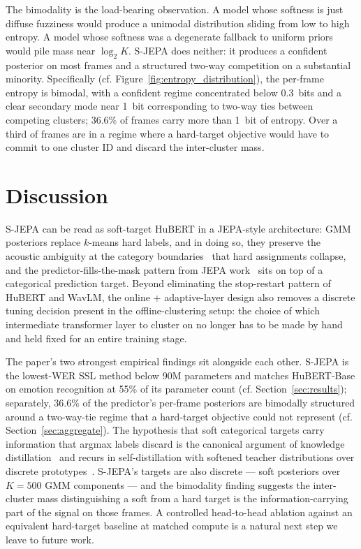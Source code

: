 \documentclass[9pt,twocolumn]{article}
\theoremstyle{plain}
\theoremstyle{definition}
\theoremstyle{remark}
\begin{document}
The bimodality is the load-bearing observation. A model whose softness is just diffuse fuzziness would produce a unimodal distribution sliding from low to high entropy. A model whose softness was a degenerate fallback to uniform priors would pile mass near $\log_2 K$. S-JEPA does neither: it produces a confident posterior on most frames and a structured two-way competition on a substantial minority. Specifically (cf. Figure~\ref{fig:entropy_distribution}), the per-frame entropy is bimodal, with a confident regime concentrated below 0.3~bits and a clear secondary mode near 1~bit corresponding to two-way ties between competing clusters; 36.6\% of frames carry more than 1~bit of entropy. Over a third of frames are in a regime where a hard-target objective would have to commit to one cluster ID and discard the inter-cluster mass.


\section{Discussion}

S-JEPA can be read as soft-target HuBERT in a JEPA-style architecture: GMM posteriors replace $k$-means hard labels, and in doing so, they preserve the acoustic ambiguity at the category boundaries~\citep{ladefoged2014course,stevens1998acoustic} that hard assignments collapse, and the predictor-fills-the-mask pattern from JEPA work~\citep{lecun2022jepa,assran2023ijepa,fang2024ajepa} sits on top of a categorical prediction target. Beyond eliminating the stop-restart pattern of HuBERT and WavLM, the online + adaptive-layer design also removes a discrete tuning decision present in the offline-clustering setup: the choice of which intermediate transformer layer to cluster on no longer has to be made by hand and held fixed for an entire training stage.

The paper's two strongest empirical findings sit alongside each other. S-JEPA is the lowest-WER SSL method below 90M parameters and matches HuBERT-Base on emotion recognition at 55\% of its parameter count (cf. Section~\ref{sec:results}); separately, 36.6\% of the predictor's per-frame posteriors are bimodally structured around a two-way-tie regime that a hard-target objective could not represent (cf. Section~\ref{sec:aggregate}). The hypothesis that soft categorical targets carry information that argmax labels discard is the canonical argument of knowledge distillation~\citep{hinton2015distilling} and recurs in self-distillation with softened teacher distributions over discrete prototypes~\citep{caron2021dino}. S-JEPA's targets are also discrete --- soft posteriors over $K{=}500$ GMM components --- and the bimodality finding suggests the inter-cluster mass distinguishing a soft from a hard target is the information-carrying part of the signal on those frames. A controlled head-to-head ablation against an equivalent hard-target baseline at matched compute is a natural next step we leave to future work.
\end{document}
